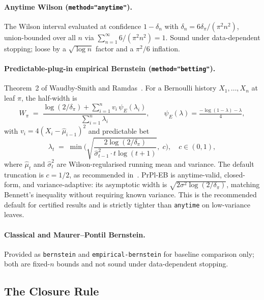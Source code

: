 \documentclass[runningheads]{llncs}
\newcommand{\code}[1]{\texttt{#1}}
\begin{document}
\paragraph{Anytime Wilson (\code{method="anytime"}).}
The Wilson interval evaluated at confidence $1 - \delta_n$ with
$\delta_n = 6\delta_\pi/(\pi^2 n^2)$, union-bounded over all $n$ via
$\sum_{n=1}^\infty 6/(\pi^2 n^2) = 1$.  Sound under data-dependent
stopping; loose by a $\sqrt{\log n}$ factor and a $\pi^2/6$
inflation.

\paragraph{Predictable-plug-in empirical Bernstein (\code{method="betting"}).}
Theorem~2 of Waudby-Smith and Ramdas~\cite{waudbysmith2024betting}.
For a Bernoulli history $X_1,\ldots,X_n$ at leaf $\pi$, the half-width
is
\begin{equation}\label{eq:prpl-eb}
  W_\pi \;=\;
    \frac{\log(2/\delta_\pi) + \sum_{i=1}^n v_i\,\psi_E(\lambda_i)}
         {\sum_{i=1}^n \lambda_i},
  \qquad
  \psi_E(\lambda) = \tfrac{-\log(1-\lambda) - \lambda}{4},
\end{equation}
with $v_i = 4(X_i - \hat\mu_{i-1})^2$ and predictable bet
\begin{equation}
  \lambda_t \;=\; \min\!\Bigg(
    \sqrt{\frac{2\log(2/\delta_\pi)}
              {\hat\sigma_{t-1}^2 \cdot t\log(t+1)}},\;c\Bigg),
  \quad c \in (0,1),
\end{equation}
where $\hat\mu_t$ and $\hat\sigma_t^2$ are Wilson-regularised running
mean and variance.  The default truncation is $c = 1/2$, as
recommended in~\cite[\S3.2]{waudbysmith2024betting}.  PrPl-EB is
anytime-valid, closed-form, and variance-adaptive: its asymptotic
width is $\sqrt{2\sigma^2\log(2/\delta_\pi)}$, matching Bennett's
inequality without requiring known variance.  This is the recommended
default for certified results and is strictly tighter than
\code{anytime} on low-variance leaves.

\paragraph{Classical and Maurer--Pontil Bernstein.}
Provided as \code{bernstein} and \code{empirical-bernstein} for
baseline comparison only; both are fixed-$n$ bounds and not sound
under data-dependent stopping.

\subsection{The Closure Rule}\label{sec:closure}
\end{document}

